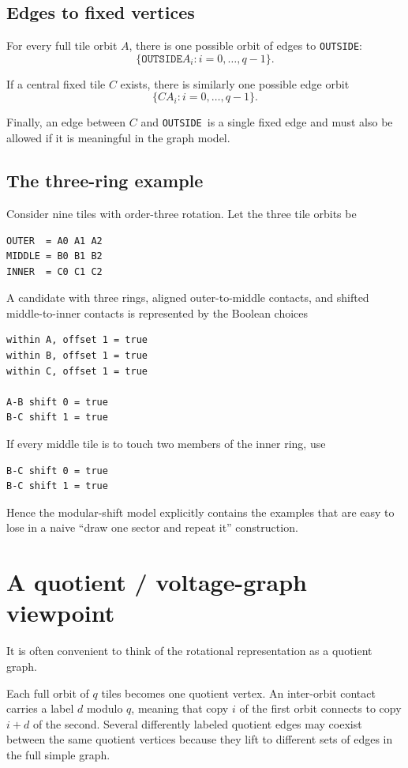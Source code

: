 \documentclass[11pt]{article}
\newcommand{\OUT}{\texttt{OUTSIDE}}
\begin{document}
\subsection{Edges to fixed vertices}

For every full tile orbit \(A\), there is one possible orbit of edges to \OUT:
\[
\{\OUT A_i : i=0,\ldots,q-1\}.
\]

If a central fixed tile \(C\) exists, there is similarly one possible edge orbit
\[
\{C A_i : i=0,\ldots,q-1\}.
\]

Finally, an edge between \(C\) and \OUT\ is a single fixed edge and must also be allowed if it is meaningful in the graph model.

\subsection{The three-ring example}

Consider nine tiles with order-three rotation. Let the three tile orbits be
\begin{lstlisting}
OUTER  = A0 A1 A2
MIDDLE = B0 B1 B2
INNER  = C0 C1 C2
\end{lstlisting}

A candidate with three rings, aligned outer-to-middle contacts, and shifted middle-to-inner contacts is represented by the Boolean choices
\begin{lstlisting}
within A, offset 1 = true
within B, offset 1 = true
within C, offset 1 = true

A-B shift 0 = true
B-C shift 1 = true
\end{lstlisting}

If every middle tile is to touch two members of the inner ring, use
\begin{lstlisting}
B-C shift 0 = true
B-C shift 1 = true
\end{lstlisting}

Hence the modular-shift model explicitly contains the examples that are easy to lose in a naive ``draw one sector and repeat it'' construction.

\section{A quotient / voltage-graph viewpoint}

It is often convenient to think of the rotational representation as a quotient graph.

Each full orbit of \(q\) tiles becomes one quotient vertex. An inter-orbit contact carries a label \(d\) modulo \(q\), meaning that copy \(i\) of the first orbit connects to copy \(i+d\) of the second. Several differently labeled quotient edges may coexist between the same quotient vertices because they lift to different sets of edges in the full simple graph.
\end{document}
